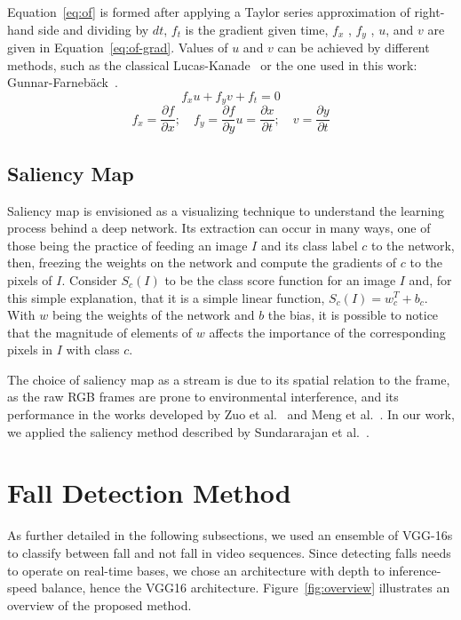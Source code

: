 \documentclass[10pt, conference, compsocconf]{IEEEtran}
\begin{document}
Equation~\ref{eq:of} is formed after applying a Taylor series approximation of right-hand side and dividing by $dt$, $f_t$ is the gradient given time, $f_x$ , $f_y$ , $u$, and $v$ are given in Equation~\ref{eq:of-grad}. Values of $u$ and $v$ can be achieved by different methods, such as the classical Lucas-Kanade~\cite{jain2018abnormal} or the one used in this work: Gunnar-Farneb\"ack~\cite{lowhur2015dense}.
\begin{equation}
\label{eq:of}
f_xu + f_yv + f_t=0
\end{equation}
\begin{equation}
\label{eq:of-grad}
f_x = \frac{\partial f}{\partial x}; \quad f_y = \frac{\partial f}{\partial y}u = \frac{\partial x}{\partial t}; \quad v = \frac{\partial y}{\partial t}
\end{equation}

\subsection{Saliency Map}
\label{sec:saliency}

Saliency map is envisioned as a visualizing technique to understand the learning process behind a deep network. Its extraction can occur in many ways, one of those being the practice of feeding an image $I$ and its class label $c$ to the network, then, freezing the weights on the network and compute the gradients of $c$ to the pixels of $I$. Consider $S_c(I)$ to be the class score function for an image $I$ and, for this simple explanation, that it is a simple linear function, $S_c(I) = w_c^T + b_c$. With $w$ being the weights of the network and $b$ the bias, it is possible to notice that the magnitude of elements of $w$ affects the importance of the corresponding pixels in $I$ with class $c$.

The choice of saliency map as a stream is due to its spatial relation to the frame, as the raw RGB frames are prone to environmental interference, and its performance in the works developed by Zuo et al.~\cite{zuo2019enhanced} and Meng et al.~\cite{Meng2018interpretable}. In our work, we applied the saliency method described by Sundararajan et al.~\cite{sundararajan2017axiomatic}.

\section{Fall Detection Method}
\label{sec:method}

As further detailed in the following subsections, we used an ensemble of VGG-16s to classify between fall and not fall in video sequences. Since detecting falls needs to operate on real-time bases, we chose an architecture with depth to inference-speed balance, hence the VGG16 architecture. Figure~\ref{fig:overview} illustrates an overview of the proposed method.
\end{document}
